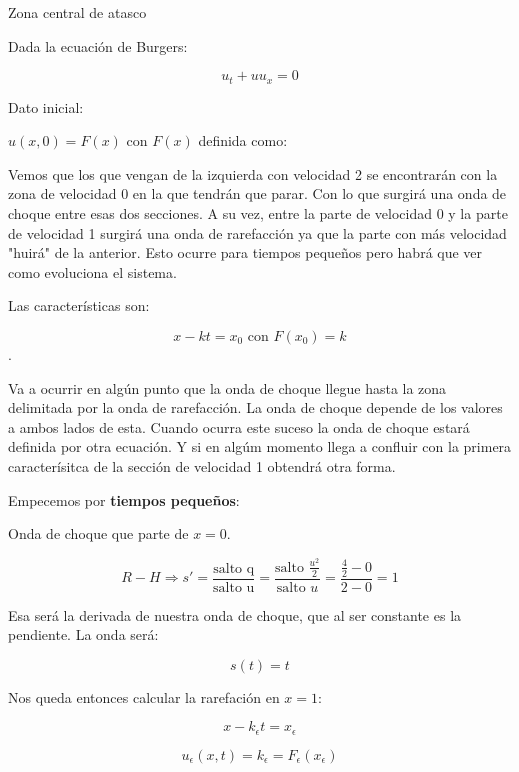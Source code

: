 		\begin{example}{Zona central de atasco}

			Dada la ecuación de Burgers:

			$$u_t + u u_x = 0$$

			Dato inicial:

			$u(x,0) = F(x)$ con $F(x)$ definida como:

			\begin{figure}[hbtp]
				\centering
				\caption{}
				\label{fig:FTresVelocidades}
			\end{figure}



			Vemos que los que vengan de la izquierda con velocidad 2 se encontrarán con la zona de velocidad 0 en la que tendrán que parar. Con lo que surgirá una onda de choque entre esas dos secciones. A su vez, entre la parte de velocidad 0 y la parte de velocidad 1 surgirá una onda de rarefacción ya que la parte con más velocidad "huirá" de la anterior. Esto ocurre para tiempos pequeños pero habrá que ver como evoluciona el sistema.

			Las características son:

			$$x - kt = x_0 \text{ con } F(x_0) = k$$.

			Va a ocurrir en algún punto que la onda de choque llegue hasta la zona delimitada por la onda de rarefacción. La onda de choque depende de los valores a ambos lados de esta. Cuando ocurra este suceso la onda de choque estará definida por otra ecuación. Y si en algúm momento llega a confluir con la primera caracterísitca de la sección de velocidad 1 obtendrá otra forma.


			Empecemos por \textbf{tiempos pequeños}:

			Onda de choque que parte de $x=0$.

			$$R-H \Rightarrow s' = \frac{\text{salto q}}{\text{salto u}} = \frac{\text{salto }\frac{u^2}{2}}{\text{salto }u} = \frac{\frac{4}{2} - 0}{2-0} = 1 $$

			Esa será la derivada de nuestra onda de choque, que al ser constante es la pendiente. La onda será:

			$$s(t) = t$$

			Nos queda entonces calcular la rarefación en $x=1$:

			$$x-k_\epsilon t = x_\epsilon$$

			$$u_\epsilon (x,t) = k_\epsilon = F_\epsilon (x_\epsilon)$$


\end{example}
